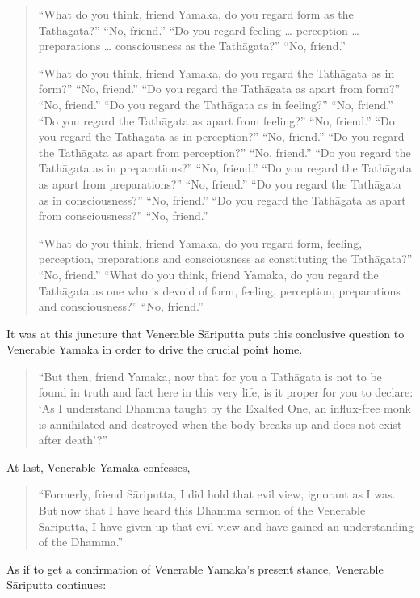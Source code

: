 \begin{quote}
``What do you think, friend Yamaka, do you regard form as the Tathāgata?'' ``No, friend.'' ``Do you regard feeling \ldots{} perception \ldots{} preparations \ldots{} consciousness as the Tathāgata?'' ``No, friend.''

``What do you think, friend Yamaka, do you regard the Tathāgata as in form?'' ``No, friend.'' ``Do you regard the Tathāgata as apart from form?'' ``No, friend.'' ``Do you regard the Tathāgata as in feeling?'' ``No, friend.'' ``Do you regard the Tathāgata as apart from feeling?'' ``No, friend.'' ``Do you regard the Tathāgata as in perception?'' ``No, friend.'' ``Do you regard the Tathāgata as apart from perception?'' ``No, friend.'' ``Do you regard the Tathāgata as in preparations?'' ``No, friend.'' ``Do you regard the Tathāgata as apart from preparations?'' ``No, friend.'' ``Do you regard the Tathāgata as in consciousness?'' ``No, friend.'' ``Do you regard the Tathāgata as apart from consciousness?'' ``No, friend.''

``What do you think, friend Yamaka, do you regard form, feeling, perception, preparations and consciousness as constituting the Tathāgata?'' ``No, friend.'' ``What do you think, friend Yamaka, do you regard the Tathāgata as one who is devoid of form, feeling, perception, preparations and consciousness?'' ``No, friend.''
\end{quote}

It was at this juncture that Venerable Sāriputta puts this conclusive question to Venerable Yamaka in order to drive the crucial point home.

\begin{quote}
``But then, friend Yamaka, now that for you a Tathāgata is not to be found in truth and fact here in this very life, is it proper for you to declare: `As I understand Dhamma taught by the Exalted One, an influx-free monk is annihilated and destroyed when the body breaks up and does not exist after death'?''
\end{quote}

At last, Venerable Yamaka confesses,

\begin{quote}
``Formerly, friend Sāriputta, I did hold that evil view, ignorant as I was. But now that I have heard this Dhamma sermon of the Venerable Sāriputta, I have given up that evil view and have gained an understanding of the Dhamma.''
\end{quote}

As if to get a confirmation of Venerable Yamaka's present stance, Venerable Sāriputta continues:

